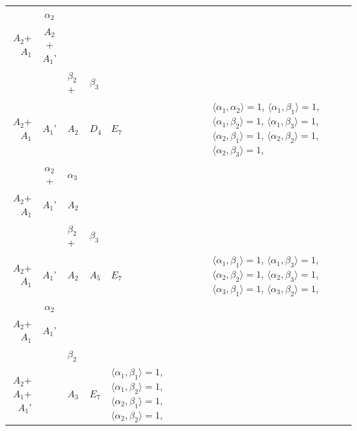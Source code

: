 \documentclass[12pt]{report}
\begin{document}
\begin{appendix}
{\begin{longtable}{rcl p{1cm}p{1cm}p{3cm} }
\begin{tabular}{cc}$\alpha_1$+ & $\alpha_2$\\\tiny{ $A_2$+$A_1$ } & \tiny{ $A_2$+$A_1$' }\end{tabular} &\begin{tabular}{c} = \\~ \end{tabular} & \begin{tabular}{ccc}$\beta_1$+ & $\beta_2$+ & $\beta_3$\\\tiny{ $A_2$+$A_1$ } & \tiny{ $A_1$' } & \tiny{ $A_2$ }\end{tabular} & $D_4$ & $E_7$ & $\langle\alpha_1, \alpha_2\rangle=1$,  $\langle\alpha_1, \beta_1\rangle=1$, $\langle\alpha_1, \beta_2\rangle=1$, $\langle\alpha_1, \beta_3\rangle=1$, $\langle\alpha_2, \beta_1\rangle=1$, $\langle\alpha_2, \beta_2\rangle=1$, $\langle\alpha_2, \beta_3\rangle=1$, 
\\
\begin{tabular}{ccc}$\alpha_1$+ & $\alpha_2$+ & $\alpha_3$\\\tiny{ $A_2$+$A_1$ } & \tiny{ $A_1$' } & \tiny{ $A_2$ }\end{tabular} &\begin{tabular}{c} = \\~ \end{tabular} & \begin{tabular}{ccc}$\beta_1$+ & $\beta_2$+ & $\beta_3$\\\tiny{ $A_2$+$A_1$ } & \tiny{ $A_1$' } & \tiny{ $A_2$ }\end{tabular} & $A_5$ & $E_7$ &  $\langle\alpha_1, \beta_1\rangle=1$, $\langle\alpha_1, \beta_3\rangle=1$, $\langle\alpha_2, \beta_2\rangle=1$, $\langle\alpha_2, \beta_3\rangle=1$, $\langle\alpha_3, \beta_1\rangle=1$, $\langle\alpha_3, \beta_2\rangle=1$, 
\\
\begin{tabular}{cc}$\alpha_1$+ & $\alpha_2$\\\tiny{ $A_2$+$A_1$ } & \tiny{ $A_1$' }\end{tabular} &\begin{tabular}{c} = \\~ \end{tabular} & \begin{tabular}{cc}$\beta_1$+ & $\beta_2$\\\tiny{ $A_2$+$A_1$+$A_1$' } & \tiny{  }\end{tabular} & $A_3$ & $E_7$ &  $\langle\alpha_1, \beta_1\rangle=1$, $\langle\alpha_1, \beta_2\rangle=1$, $\langle\alpha_2, \beta_1\rangle=1$, $\langle\alpha_2, \beta_2\rangle=1$, 

\end{longtable}}
\end{appendix}
\end{document}
